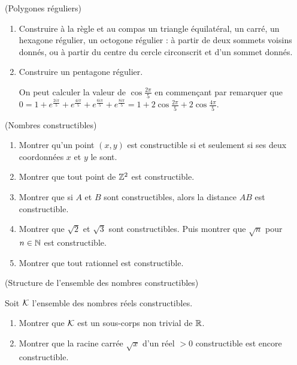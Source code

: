 \documentclass[a4paper,11pt,reqno]{amsart}
\begin{document}
\begin{exo}  (Polygones réguliers)

  \begin{enumerate}
    \item Construire à la règle et au compas un triangle équilatéral, un carré, un hexagone régulier, un octogone régulier : à partir de deux sommets voisins donnés, ou à partir du centre du cercle circonscrit et d'un sommet donnés.
    \item Construire un pentagone régulier.\\
    \begin{indication}
      On peut calculer la valeur de $\cos \frac{2\pi}{5}$ en commençant par remarquer que $0=1+e^{\frac{2i\pi}{5}}+e^{\frac{4i\pi}{5}}+e^{\frac{6i\pi}{5}}+e^{\frac{8i\pi}{5}}=1+2\cos\frac{2\pi}{5}+2\cos\frac{4\pi}{5}$.
    \end{indication}
  \end{enumerate}
\end{exo}


\begin{exo} (Nombres constructibles)

  \begin{enumerate}
    \item Montrer qu'un point $(x,y)$ est constructible si et seulement si ses deux coordonnées $x$ et $y$ le sont.
    \item Montrer que tout point de $\mathbb{Z}^2$ est constructible.
    \item Montrer que si $A$ et $B$ sont constructibles, alors la distance $AB$ est constructible.
    \item Montrer que $\sqrt{2}$ et $\sqrt{3}$ sont constructibles. Puis montrer que $\sqrt{n}$ pour $n \in \mathbb{N}$ est constructible.
    \item Montrer que tout rationnel est constructible.
  \end{enumerate}
\end{exo}


\begin{exo}  (Structure de l'ensemble des nombres constructibles)

  Soit $\mathcal K$ l'ensemble  des nombres réels constructibles.
  \begin{enumerate}
    \item Montrer que $\mathcal K$ est un sous-corps non trivial de $\mathbb{R}$.
    \item Montrer que la racine carrée $\sqrt{x}$ d'un réel $>0$ constructible est encore constructible.
  \end{enumerate}
\end{exo}
\end{document}
